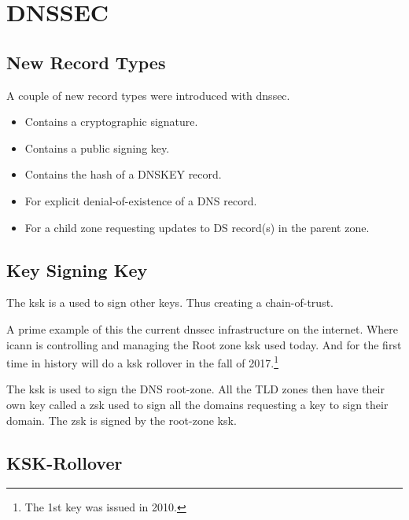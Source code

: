 \section{DNSSEC}



\subsection{New Record Types}

A couple of new record types were introduced with \gls{dnssec}.\cite{HowDNSSE22:online}

\begin{itemize}
    \item {}       Contains a cryptographic signature.
    \item {}      Contains a public signing key.
    \item {}          Contains the hash of a DNSKEY record.
    \item {}  For explicit denial-of-existence of a DNS record.
    \item {} For a child zone requesting updates to DS record(s) in the parent zone.
\end{itemize}
    
\subsection[KSK]{Key Signing Key}

The \gls{ksk} is a used to sign other keys. Thus creating a chain-of-trust.

A prime example of this the current \gls{dnssec} infrastructure on the internet. Where \gls{icann} is controlling and managing the Root zone \gls{ksk} used today. And for the first time in history will do a \gls{ksk} rollover in the fall of 2017.\footnote{The 1st key was issued in 2010.}

The \gls{ksk} is used to sign the DNS root-zone. All the TLD zones then have their own key called a \gls{zsk} used to sign all the domains requesting a key to sign their domain. The \gls{zsk} is signed by the root-zone \gls{ksk}.

\subsection[Rollover]{KSK-Rollover}

